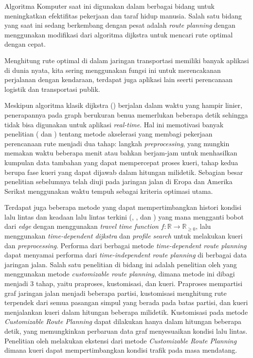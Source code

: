 Algoritma Komputer saat ini digunakan dalam berbagai bidang untuk meningkatkan efektifitas pekerjaan dan taraf hidup manusia. Salah satu bidang yang saat ini sedang berkembang dengan pesat adalah \textit{route planning} dengan menggunakan modifikasi dari algoritma dijkstra untuk mencari rute optimal dengan cepat. 

Menghitung rute optimal di dalam jaringan transportasi memiliki banyak aplikasi di dunia nyata, kita sering menggunakan fungsi ini untuk merencakanan perjalanan dengan kendaraan, terdapat juga aplikasi lain seerti perencanaan logistik dan transportasi publik.

Meskipun algoritma klasik dijkstra (\cite{Dijkstra59}) berjalan dalam waktu yang hampir linier, penerapannya pada graph berukuran benua memerlukan beberapa detik sehingga tidak bisa digunakan untuk aplikasi \textit{real-time}. Hal ini memotivasi banyak penelitian (\cite{Delling2009} dan \cite{Bast2015}) tentang metode akselerasi yang membagi pekerjaan perencanaan rute menjadi dua tahap: langkah \textit{preprocessing}, yang mungkin memakan waktu beberapa menit atau bahkan berjam-jam untuk menhasilkan kumpulan data tambahan yang dapat mempercepat proses kueri, tahap  kedua berupa fase kueri yang dapat dijawab dalam hitungan milidetik. Sebagian besar penelitian sebelumnya telah diuji pada jaringan jalan di Eropa dan Amerika Serikat menggunakan waktu tempuh sebagai kriteria optimasi utama.

Terdapat juga beberapa metode yang dapat mempertimbangkan histori kondisi lalu lintas dan keadaan lalu lintas terkini (\cite{DellingTD2009}, \cite{Baum2016}, dan \cite{Veit2013}) yang mana mengganti bobot dari \textit{edge} dengan menggunakan \textit{travel time function} $f : \mathbb{R} \to \mathbb{R}_{\geq 0}$, lalu menggunakan \textit{time-dependent dijkstra} dan \textit{profile search} untuk melakukan kueri dan \textit{preprocessing}. Performa dari berbagai metode \textit{time-dependent route planning} dapat menyamai performa dari \textit{time-independent route planning} di berbagai data jaringan jalan. Salah satu penelitian di bidang ini adalah penelitian oleh \cite{Delling2015} yang menggunakan metode \textit{customizable route planning}, dimana metode ini dibagi menjadi 3 tahap, yaitu praproses, kustomisasi, dan kueri. Praproses mempartisi graf jaringan jalan menjadi beberapa partisi, kustomisasi menghitung rute terpendek dari semua pasangan simpul yang berada pada batas partisi, dan kueri menjalankan kueri dalam hitungan beberapa milidetik. Kustomisasi pada metode \textit{Customizable Route Planning} dapat dilakukan hanya dalam hitungan beberapa detik, yang memungkinkan perbaruan data graf menyesuaikan kondisi lalu lintas. Penelitian oleh \cite{Baum2016} melakukan ekstensi dari metode \textit{Customizable Route Planning} dimana kueri dapat mempertimbangkan kondisi trafik pada masa mendatang.

